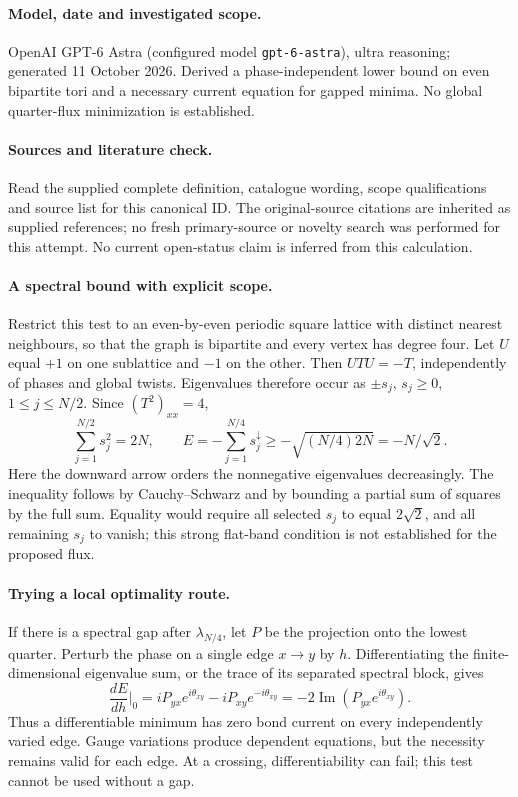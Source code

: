 \documentclass[11pt]{article}
\begin{document}
\paragraph{Model, date and investigated scope.}
OpenAI GPT-6 Astra (configured model \texttt{gpt-6-astra}), ultra reasoning; generated 11 October 2026. Derived a phase-independent lower bound on even bipartite tori and a necessary current equation for gapped minima. No global quarter-flux minimization is established.

\paragraph{Sources and literature check.}
Read the supplied complete definition, catalogue wording, scope qualifications and source list for this canonical ID. The original-source citations are inherited as supplied references; no fresh primary-source or novelty search was performed for this attempt. No current open-status claim is inferred from this calculation.

\paragraph{A spectral bound with explicit scope.}Restrict this test to an even-by-even periodic square lattice with distinct nearest neighbours, so that the graph is bipartite and every vertex has degree four. Let \(U\) equal \(+1\) on one sublattice and \(-1\) on the other. Then \(UTU=-T\), independently of phases and global twists. Eigenvalues therefore occur as \(\pm s_j\), \(s_j\ge0\), \(1\le j\le N/2\). Since \((T^2)_{xx}=4\),
\[\sum_{j=1}^{N/2}s_j^2=2N,\qquad
E=-\sum_{j=1}^{N/4}s_j^{\downarrow}\ge-\sqrt{(N/4)2N}=-N/\sqrt2 .\]
Here the downward arrow orders the nonnegative eigenvalues decreasingly. The inequality follows by Cauchy--Schwarz and by bounding a partial sum of squares by the full sum. Equality would require all selected \(s_j\) to equal \(2\sqrt2\), and all remaining \(s_j\) to vanish; this strong flat-band condition is not established for the proposed flux.
\paragraph{Trying a local optimality route.}If there is a spectral gap after \(\lambda_{N/4}\), let \(P\) be the projection onto the lowest quarter. Perturb the phase on a single edge \(x\to y\) by \(h\). Differentiating the finite-dimensional eigenvalue sum, or the trace of its separated spectral block, gives
\[\frac{dE}{dh}\bigg|_{0}=iP_{yx}e^{i\theta_{xy}}-iP_{xy}e^{-i\theta_{xy}}=-2\operatorname{Im}(P_{yx}e^{i\theta_{xy}}).\]
Thus a differentiable minimum has zero bond current on every independently varied edge. Gauge variations produce dependent equations, but the necessity remains valid for each edge. At a crossing, differentiability can fail; this test cannot be used without a gap.
\end{document}
